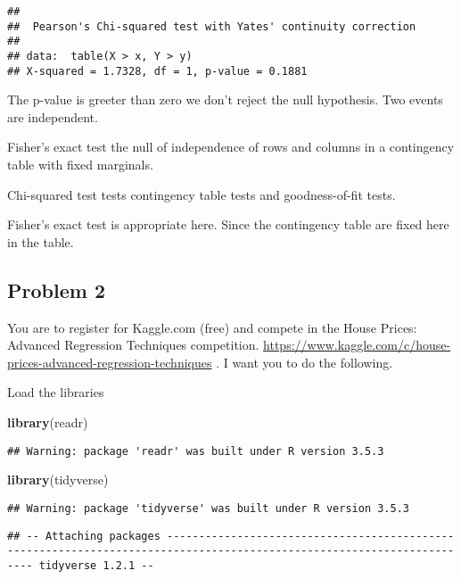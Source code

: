 \documentclass[]{article}
\newenvironment{Shaded}{\begin{snugshade}}{\end{snugshade}}
\newcommand{\KeywordTok}[1]{\textcolor[rgb]{0.13,0.29,0.53}{\textbf{#1}}}
\newcommand{\NormalTok}[1]{#1}
\begin{document}
\begin{verbatim}
## 
##  Pearson's Chi-squared test with Yates' continuity correction
## 
## data:  table(X > x, Y > y)
## X-squared = 1.7328, df = 1, p-value = 0.1881
\end{verbatim}

The p-value is greeter than zero we don't reject the null hypothesis.
Two events are independent.

Fisher's exact test the null of independence of rows and columns in a
contingency table with fixed marginals.

Chi-squared test tests contingency table tests and goodness-of-fit
tests.

Fisher's exact test is appropriate here. Since the contingency table are
fixed here in the table.

\subsection{Problem 2}\label{problem-2}

You are to register for Kaggle.com (free) and compete in the House
Prices: Advanced Regression Techniques competition.
\url{https://www.kaggle.com/c/house-prices-advanced-regression-techniques}
. I want you to do the following.

Load the libraries

\begin{Shaded}
\begin{Highlighting}[]
\KeywordTok{library}\NormalTok{(readr)}
\end{Highlighting}
\end{Shaded}

\begin{verbatim}
## Warning: package 'readr' was built under R version 3.5.3
\end{verbatim}

\begin{Shaded}
\begin{Highlighting}[]
\KeywordTok{library}\NormalTok{(tidyverse)}
\end{Highlighting}
\end{Shaded}

\begin{verbatim}
## Warning: package 'tidyverse' was built under R version 3.5.3
\end{verbatim}

\begin{verbatim}
## -- Attaching packages ----------------------------------------------------------------------------------------------------------------------- tidyverse 1.2.1 --
\end{verbatim}
\end{document}
